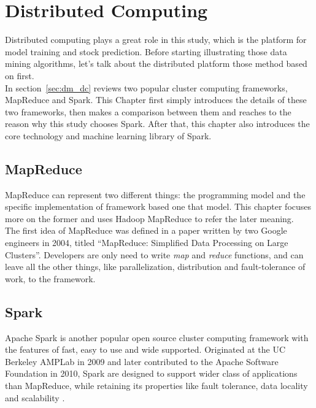 \chapter{Distributed Computing}
\label{ch:spark}

Distributed computing plays a great role in this study, which is the platform for model training and stock prediction. Before starting illustrating those data mining algorithms, let’s talk about the distributed platform those method based on first.\\


In section~\ref{sec:dm_dc} reviews two popular cluster computing frameworks, MapReduce and Spark. This Chapter first simply introduces the details of these two frameworks, then makes a comparison between them and reaches to the reason why this study chooses Spark. After that, this chapter also introduces the core technology and machine learning library of Spark.


\section{MapReduce}
MapReduce can represent two different things: the programming model and the specific implementation of framework based one that model.\cite[p.~25]{sammer2012hadoop} This chapter focuses more on the former and uses Hadoop MapReduce to refer the later meaning.\\

The first idea of MapReduce was defined in a paper written by two Google engineers in 2004, titled “MapReduce: Simplified Data Processing on Large Clusters”\cite[p.~25]{sammer2012hadoop}. Developers are only need to write \emph{map} and \emph{reduce} functions, and can leave all the other things, like parallelization, distribution and fault-tolerance of work, to the framework.


\section{Spark}

Apache Spark is another popular open source cluster computing framework with the features of fast, easy to use and wide supported. Originated at the UC Berkeley AMPLab in 2009 and later contributed to the Apache Software Foundation in 2010, Spark are designed to support wider class of applications than MapReduce, while retaining its properties like fault tolerance, data locality and scalability \cite{meng2016mllib}.\\


